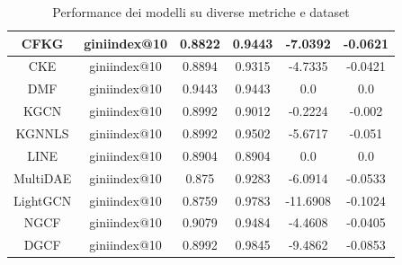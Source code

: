 \begin{table}[H]
{\begin{tabular}{|c|c|c|c|c|c|}
CFKG             & giniindex@10     & 0.8822                        & 0.9443                           & -7.0392                               & -0.0621                               \\ \hline
CKE              & giniindex@10     & 0.8894                        & 0.9315                           & -4.7335                               & -0.0421                               \\ \hline
DMF              & giniindex@10     & 0.9443                        & 0.9443                           & 0.0                                   & 0.0                                   \\ \hline
KGCN             & giniindex@10     & 0.8992                        & 0.9012                           & -0.2224                               & -0.002                                \\ \hline
KGNNLS           & giniindex@10     & 0.8992                        & 0.9502                           & -5.6717                               & -0.051                                \\ \hline
LINE             & giniindex@10     & 0.8904                        & 0.8904                           & 0.0                                   & 0.0                                   \\ \hline
MultiDAE         & giniindex@10     & 0.875                         & 0.9283                           & -6.0914                               & -0.0533                               \\ \hline
LightGCN         & giniindex@10     & 0.8759                        & 0.9783                           & -11.6908                              & -0.1024                               \\ \hline
NGCF             & giniindex@10     & 0.9079                        & 0.9484                           & -4.4608                               & -0.0405                               \\ \hline
DGCF             & giniindex@10     & 0.8992                        & 0.9845                           & -9.4862                               & -0.0853                               \\ \hline
\end{tabular}
    }
    \caption{Performance dei modelli su diverse metriche e dataset}
    \end{table}


